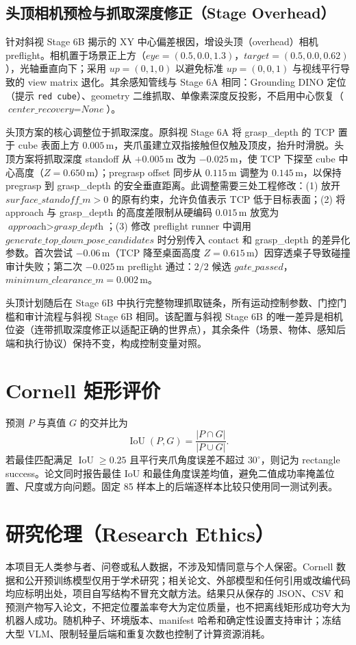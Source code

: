 \documentclass{l4proj}
\begin{document}
\subsection{头顶相机预检与抓取深度修正（Stage Overhead）}
针对斜视 Stage 6B 揭示的 XY 中心偏差根因，增设头顶（overhead）相机 preflight。相机置于场景正上方（$\textit{eye}=(0.5,0.0,1.3)$，$\textit{target}=(0.5,0.0,0.62)$），光轴垂直向下；采用 $\textit{up}=(0,1,0)$ 以避免标准 $\textit{up}=(0,0,1)$ 与视线平行导致的 view matrix 退化。其余感知管线与 Stage 6A 相同：Grounding DINO 定位（提示 \texttt{red cube}）、geometry 二维抓取、单像素深度反投影，不启用中心恢复（$\textit{center\_recovery}=\textit{None}$）。

头顶方案的核心调整位于抓取深度。原斜视 Stage 6A 将 grasp\_depth 的 TCP 置于 cube 表面上方 $0.005$\,m，夹爪虽建立双指接触但仅触及顶皮，抬升时滑脱。头顶方案将抓取深度 standoff 从 $+0.005$\,m 改为 $-0.025$\,m，使 TCP 下探至 cube 中心高度（$Z=0.650$\,m）；pregrasp offset 同步从 $0.115$\,m 调整为 $0.145$\,m，以保持 pregrasp 到 grasp\_depth 的安全垂直距离。此调整需要三处工程修改：(1) 放开 $\textit{surface\_standoff\_m}>0$ 的原有约束，允许负值表示 TCP 低于目标表面；(2) 将 approach 与 grasp\_depth 的高度差限制从硬编码 $0.015$\,m 放宽为 $\textit{approach}>\textit{grasp\_depth}$；(3) 修改 preflight runner 中调用 $\textit{generate\_top\_down\_pose\_candidates}$ 时分别传入 contact 和 grasp\_depth 的差异化参数。首次尝试 $-0.06$\,m（TCP 降至桌面高度 $Z=0.615$\,m）因穿透桌子导致碰撞审计失败；第二次 $-0.025$\,m preflight 通过：$2/2$ 候选 $\textit{gate\_passed}$，$\textit{minimum\_clearance\_m}=0.002$\,m。

头顶计划随后在 Stage 6B 中执行完整物理抓取链条，所有运动控制参数、门控门槛和审计流程与斜视 Stage 6B 相同。该配置与斜视 Stage 6B 的唯一差异是相机位姿（连带抓取深度修正以适配正确的世界点），其余条件（场景、物体、感知后端和执行协议）保持不变，构成控制变量对照。

\section{Cornell 矩形评价}
预测 $P$ 与真值 $G$ 的交并比为
\[
\operatorname{IoU}(P,G)=\frac{|P\cap G|}{|P\cup G|}.
\]
若最佳匹配满足 $\operatorname{IoU}\geq0.25$ 且平行夹爪角度误差不超过 $30^\circ$，则记为 rectangle success。论文同时报告最佳 IoU 和最佳角度误差均值，避免二值成功率掩盖位置、尺度或方向问题。固定 85 样本上的后端逐样本比较只使用同一测试列表。

\section{研究伦理（Research Ethics）}
本项目无人类参与者、问卷或私人数据，不涉及知情同意与个人保密。Cornell 数据和公开预训练模型仅用于学术研究；相关论文、外部模型和任何引用或改编代码均应标明出处，项目自写结构不冒充文献方法。结果只从保存的 JSON、CSV 和预测产物写入论文，不把定位覆盖率夸大为定位质量，也不把离线矩形成功夸大为机器人成功。随机种子、环境版本、manifest 哈希和确定性设置支持审计；冻结大型 VLM、限制轻量后端和重复次数也控制了计算资源消耗。
\end{document}
